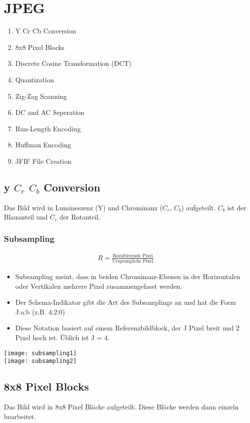 \section{JPEG}
\begin{enumerate}
    \item Y Cr Cb Conversion
    \item 8x8 Pixel Blocks
    \item Discrete Cosine Transformation (DCT)
    \item Quantization
    \item Zig-Zag Scanning
    \item DC and AC Seperation
    \item Run-Length Encoding
    \item Huffman Encoding
    \item JFIF File Creation
\end{enumerate}
\subsection{y $C_r$ $C_b$ Conversion}
Das Bild wird  in Lumineszenz (Y) und Chrominanz ($C_r$, $C_b$) aufgeteilt.
$C_b$ ist der Blauanteil und $C_r$ der Rotanteil.
\subsubsection{Subsampling}
\begin{align*}
    R = \frac{\text{Resultierende Pixel}}{\text{Ursprüngliche Pixel}}
\end{align*}
\begin{itemize}
    \item Subsampling meint, dass in beiden Chrominanz-Ebenen in der
        Horizontalen oder Vertikalen mehrere Pixel zusammengefasst werden.
    \item Der Schema-Indikator gibt die Art des Subsamplings an und hat die
        Form J:a:b (z.B. 4:2:0)
    \item Diese Notation basiert auf einem Referenzbildblock, der J Pixel breit und
        2 Pixel hoch ist. Üblich ist J = 4.
\end{itemize}
\texttt{[image: subsampling1]}\\
\texttt{[image: subsampling2]}

\subsection{8x8 Pixel Blocks}
Das Bild wird in 8x8 Pixel Blöcke aufgeteilt. Diese Blöcke werden dann einzeln bearbeitet.
